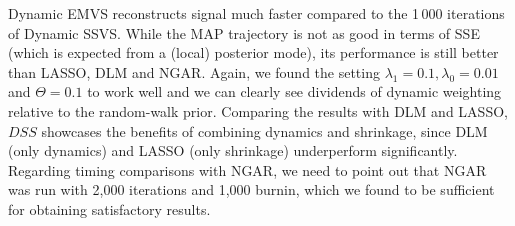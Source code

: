 \documentclass[ba]{imsart}
\numberwithin{equation}{section}
\theoremstyle{plain}
\begin{document}
{ Dynamic EMVS reconstructs  signal much faster compared to the 1\,000 iterations of Dynamic SSVS. While the MAP trajectory is not as good  in terms of SSE (which is expected from a (local) posterior mode), its  performance is still better than  LASSO, DLM and NGAR. Again, we found the setting  $\lambda_1=0.1,\lambda_0=0.01$ and $\Theta=0.1$ to work  well and we can clearly see dividends of  dynamic weighting relative to the random-walk prior. 
Comparing the results with DLM and LASSO, $DSS$ showcases the benefits of combining dynamics and shrinkage, since DLM (only dynamics) and LASSO (only shrinkage) underperform significantly.
{Regarding timing comparisons with NGAR, we need to point out that  NGAR was run with 2,000  iterations and 1,000 burnin, which we found to be sufficient for obtaining satisfactory results. }




}
\end{document}
